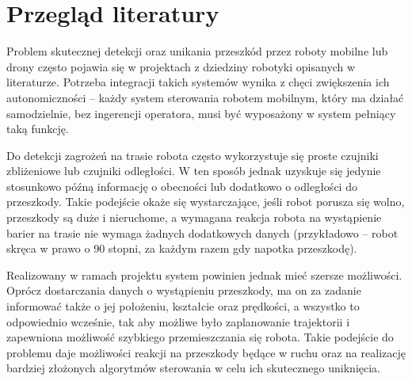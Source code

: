 \chapter{Przegląd literatury}
\label{cha:literatura}

Problem skutecznej detekcji oraz unikania przeszkód przez roboty mobilne lub drony często pojawia się w projektach z dziedziny robotyki opisanych w literaturze. Potrzeba integracji takich systemów wynika z chęci zwiększenia ich autonomiczności -- każdy system sterowania robotem mobilnym, który ma działać samodzielnie, bez ingerencji operatora, musi być wyposażony w system pełniący taką funkcję.

Do detekcji zagrożeń na trasie robota często wykorzystuje się proste czujniki zbliżeniowe lub czujniki odległości. W ten sposób jednak uzyskuje się jedynie stosunkowo późną informację o obecności lub dodatkowo o odległości do przeszkody. Takie podejście okaże się wystarczające, jeśli robot porusza się wolno, przeszkody są duże i nieruchome, a wymagana reakcja robota na wystąpienie barier na trasie nie wymaga żadnych dodatkowych danych (przykładowo -- robot skręca w prawo o 90 stopni, za każdym razem gdy napotka przeszkodę).

Realizowany w ramach projektu system powinien jednak mieć szersze możliwości. Oprócz dostarczania danych o wystąpieniu przeszkody, ma on za zadanie informować także o jej położeniu, kształcie oraz prędkości, a wszystko to odpowiednio wcześnie, tak aby możliwe było zaplanowanie trajektorii i zapewniona możliwość szybkiego przemieszczania się robota. Takie podejście do problemu daje możliwości reakcji na przeszkody będące w ruchu oraz na realizację bardziej złożonych algorytmów sterowania w celu ich skutecznego uniknięcia.


